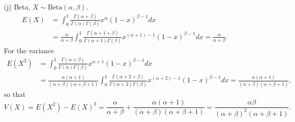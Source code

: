 \begin{itemize}
\item[(j)] Beta, $X \sim \mathrm{Beta}(\alpha, \beta)$.
\begin{equation*}
\begin{split}
E(X) &= \int_0^1 \frac{\Gamma(\alpha + \beta)}{\Gamma(\alpha) \Gamma(\beta)} x^{\alpha} (1 - x)^{\beta - 1} dx \\
    &= \frac{\alpha}{\alpha + \beta} \int_0^1 \frac{\Gamma(\alpha + 1 + \beta)}{\Gamma(\alpha + 1) \Gamma(\beta)} x^{(\alpha + 1) - 1} (1 - x)^{\beta - 1} dx
    = \frac{\alpha}{\alpha + \beta}.
\end{split}
\end{equation*}
For the variance
\begin{equation*}
\begin{split}
E(X^2) &= \int_0^1 \frac{\Gamma(\alpha + \beta)}{\Gamma(\alpha) \Gamma(\beta)} x^{\alpha + 1} (1 - x)^{\beta - 1} dx \\
    &= \frac{\alpha (\alpha + 1)}{(\alpha + \beta)(\alpha + \beta + 1)} \int_0^1 \frac{\Gamma(\alpha + 2 + \beta)}{\Gamma(\alpha + 2) \Gamma(\beta)} x^{(\alpha + 2) - 1} (1 - x)^{\beta - 1} dx
    = \frac{\alpha(\alpha + 1)}{(\alpha + \beta)(\alpha + \beta + 1)},
\end{split}
\end{equation*}
so that
\begin{equation*}
V(X) = E(X^2) - E(X)^2
    = \frac{\alpha}{\alpha + \beta} + \frac{\alpha(\alpha + 1)}{(\alpha + \beta)(\alpha + \beta + 1)}
    = \frac{\alpha \beta}{(\alpha + \beta)^2(\alpha + \beta + 1)}.
\end{equation*}


\end{itemize}
